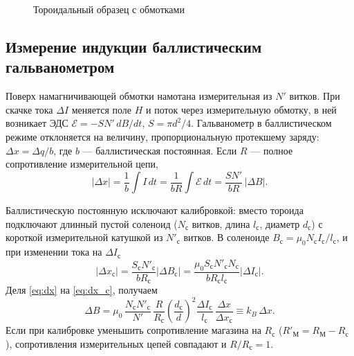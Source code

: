 \documentclass[a4paper,12pt]{article}
\newcommand{\cc}{\text{с}}   %
\begin{document}
\begin{figure}[!ht]
    \centering
    \caption{Тороидальный образец с обмотками}
    \label{fig:toroid}
\end{figure}

\subsection{Измерение индукции баллистическим гальванометром}
Поверх намагничивающей обмотки намотана измерительная из $N'$ витков.
При скачке тока $\Delta I$ меняется поле $H$ и поток через измерительную
обмотку, в ней возникает ЭДС
$\mathcal{E} = -SN'\,dB/dt$, $S = \pi d^2/4$. Гальванометр в
баллистическом режиме отклоняется на величину, пропорциональную
протекшему заряду: $\Delta x = \Delta q/b$, где $b$ --- баллистическая
постоянная. Если $R$ --- полное сопротивление измерительной цепи,
\begin{equation}
    \label{eq:dx}
    |\Delta x| = \frac{1}{b}\int I\,dt = \frac{1}{bR}\int\mathcal{E}\,dt
    = \frac{SN'}{bR}\,|\Delta B| .
\end{equation}

Баллистическую постоянную исключают калибровкой: вместо тороида
подключают длинный пустой соленоид ($N_\cc$ витков, длина $l_\cc$,
диаметр $d_\cc$) с короткой измерительной катушкой из $N'_\cc$ витков.
В соленоиде $B_\cc = \mu_0 N_\cc I_\cc / l_\cc$, и при изменении тока на
$\Delta I_\cc$
\begin{equation}
    \label{eq:dx_c}
    |\Delta x_\cc| = \frac{S_\cc N'_\cc}{bR_\cc}|\Delta B_\cc|
    = \frac{\mu_0 S_\cc N'_\cc N_\cc}{bR_\cc l_\cc}|\Delta I_\cc| .
\end{equation}
Деля \cref{eq:dx} на \cref{eq:dx_c}, получаем
\begin{equation}
    \label{eq:dB}
    \Delta B = \mu_0\,\frac{N_\cc N'_\cc}{N'}\,\frac{R}{R_\cc}
               \left(\frac{d_\cc}{d}\right)^2
               \frac{\Delta I_\cc}{l_\cc}\,
               \frac{\Delta x}{\Delta x_\cc}
             \equiv k_B\,\Delta x .
\end{equation}
Если при калибровке уменьшить сопротивление магазина на $R_\cc$
($R'_{\text{М}} = R_{\text{М}} - R_\cc$), сопротивления измерительных цепей совпадают и
$R/R_\cc = 1$.
\end{document}
